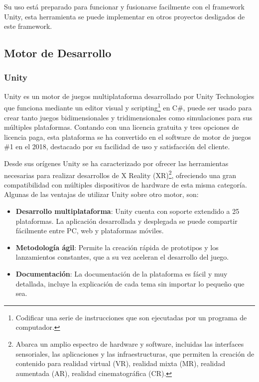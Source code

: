 Su uso está preparado para funcionar y fusionarse facilmente con el framework Unity, esta herramienta se puede implementar en otros proyectos desligados de este framework. \parencite{LeapMotionInc.2018LeapDeveloper}
\subsection{Motor de Desarrollo}
\subsubsection{Unity}
Unity es un motor de juegos multiplataforma desarrollado por Unity Technologies que funciona mediante un editor visual y scripting\footnote{Codificar una serie de instrucciones que son ejecutadas por un programa de computador.} en C\#, puede ser usado para crear tanto juegos bidimensionales y tridimensionales como simulaciones para sus múltiples plataformas. Contando con una licencia gratuita y tres opciones de licencia paga, esta plataforma se ha convertido en el software de motor de juegos \#1 en el 2018, destacado por su facilidad de uso y satisfacción del cliente. \parencite{G2Crowd2018Best2018}

Desde sus orígenes Unity se ha caracterizado por ofrecer las herramientas necesarias para realizar desarrollos de X Reality (XR)\footnote{Abarca un amplio espectro de hardware y software, incluidas las interfaces sensoriales, las aplicaciones y las infraestructuras, que permiten la creación de contenido para realidad virtual (VR), realidad mixta (MR), realidad aumentada (AR), realidad cinematográfica (CR).}, ofreciendo una gran compatibilidad con múltiples dispositivos de hardware de esta misma categoría. Algunas de las ventajas de utilizar Unity sobre otro motor, son:
\begin{itemize}
    \item \textbf{Desarrollo multiplataforma}: Unity cuenta con soporte extendido a 25 plataformas. \parencite{UnityTechnologies2018UnityPlatforms} La aplicación desarrollada y desplegada se puede compartir fácilmente entre PC, web y plataformas móviles. 
    \item \textbf{Metodología ágil}: Permite la creación rápida de prototipos y los lanzamientos constantes, que a su vez aceleran el desarrollo del juego.
    \item \textbf{Documentación}: La documentación de la plataforma es fácil y muy detallada, incluye la explicación de cada tema sin importar lo pequeño que sea.
    
\end{itemize}
    
